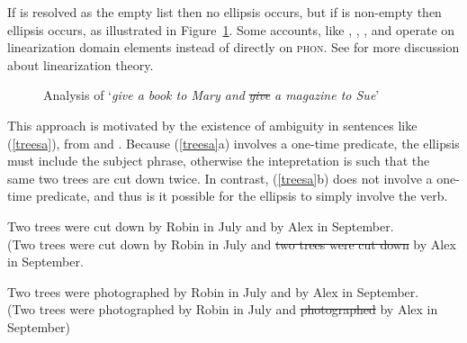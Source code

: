 \documentclass[output=paper
                ,modfonts
                ,nonflat
	        ,collection
	        ,collectionchapter
	        ,collectiontoclongg
 	        ,biblatex
                ,babelshorthands
                ,newtxmath
                ,draftmode
                ,colorlinks, citecolor=brown
]{./langsci/langscibook}
\begin{document}
\noindent
If  is resolved as the empty list then no ellipsis occurs, but if  is non-empty then ellipsis occurs, as illustrated in Figure~\ref{lpe}. 
Some accounts, like  \citet{yatabe01}, \citet{Crysmann:04}, \citet{Beavers}, and \citet{chaveslp} operate on
linearization domain elements instead of directly on \textsc{phon}.  
See  for more discussion about linearization theory.


\begin{figure}[ht]
    \centering
    

    \caption{Analysis of `\emph{give a book to Mary and} \sout{\emph{give}} \emph{a magazine to Sue}'}\label{lpe}
\end{figure}

\noindent
This approach is motivated by the existence of ambiguity in 
sentences like (\ref{treesa}), from \citet{Beavers} and \citet{chaves06}. Because (\ref{treesa}a) involves a one-time predicate, the ellipsis must include the subject phrase, otherwise
the intepretation is such that the same two trees are cut down twice. In contrast,  (\ref{treesa}b) does not involve a one-time
predicate, and thus is it possible for the ellipsis to simply
involve the verb.


\begin{exe}
\ex 
\begin{xlista}
\ex Two trees were cut down by Robin in July and by Alex in September.\\
(Two trees were cut down by Robin in July and \sout{two trees were cut down} by Alex in September.

\ex Two trees were photographed by Robin in July and by Alex in September.\\
(Two trees were photographed by Robin in July and \sout{photographed} by Alex in September)
\end{xlista}\label{treesa}
\end{exe}
\end{document}
